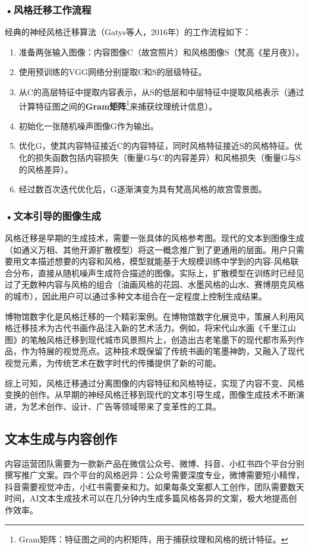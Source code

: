 \subsubsection*{\textbf{•风格迁移工作流程}}

经典的神经风格迁移算法（Gatys等人，2016年）的工作流程如下：
\begin{enumerate}
\item 准备两张输入图像：内容图像C（故宫照片）和风格图像S（梵高《星月夜》）。
\item 使用预训练的VGG网络分别提取C和S的层级特征。
\item 从C的高层特征中提取内容表示，从S的低层和中层特征中提取风格表示（通过计算特征图之间的\textbf{Gram矩阵}\footnote{Gram矩阵：特征图之间的内积矩阵，用于捕获纹理和风格的统计特征。}来捕获纹理统计信息）。
\item 初始化一张随机噪声图像G作为输出。
\item 优化G，使其内容特征接近C的内容特征，同时风格特征接近S的风格特征。优化的损失函数包括内容损失（衡量G与C的内容差异）和风格损失（衡量G与S的风格差异）。
\item 经过数百次迭代优化后，G逐渐演变为具有梵高风格的故宫雪景图。
\end{enumerate}

\subsubsection*{\textbf{•文本引导的图像生成}}

风格迁移是早期的生成技术，需要一张具体的风格参考图。现代的文本到图像生成（如通义万相、其他开源扩散模型）将这一概念推广到了更通用的层面。用户只需要用文本描述想要的内容和风格，模型就能基于大规模训练中学到的内容-风格联合分布，直接从随机噪声生成符合描述的图像。实际上，扩散模型在训练时已经见过了无数种内容与风格的组合（油画风格的花园、水墨风格的山水、赛博朋克风格的城市），因此用户可以通过多种文本组合在一定程度上控制生成结果。

博物馆数字化是风格迁移的一个精彩案例。在博物馆数字化展览中，策展人利用风格迁移技术为古代书画作品注入新的艺术活力。例如，将宋代山水画《千里江山图》的笔触风格迁移到现代城市风景照片上，创造出古老笔墨下的现代都市系列作品，作为特展的视觉亮点。这种技术既保留了传统书画的笔墨神韵，又融入了现代视觉元素，为传统艺术在数字时代的传播提供了新的可能。

综上可知，风格迁移通过分离图像的内容特征和风格特征，实现了内容不变、风格变换的创作。从早期的神经风格迁移到现代的文本引导生成，图像生成技术不断演进，为艺术创作、设计、广告等领域带来了变革性的工具。
\subsection{文本生成与内容创作}
内容运营团队需要为一款新产品在微信公众号、微博、抖音、小红书四个平台分别撰写推广文案。四个平台的风格迥异：公众号需要深度专业，微博需要短小精悍，抖音需要视觉冲击，小红书需要亲和力。如果每条文案都人工创作，团队需要数天时间，AI文本生成技术可以在几分钟内生成多篇风格各异的文案，极大地提高创作效率。

